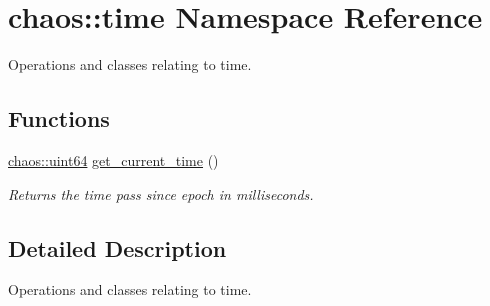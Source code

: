 \hypertarget{namespacechaos_1_1time}{\section{chaos\-:\-:time Namespace Reference}
\label{namespacechaos_1_1time}
}


Operations and classes relating to time.  


\subsection*{Functions}
\begin{DoxyCompactItemize}
\item 
\hypertarget{namespacechaos_1_1time_aaf97a80d1887b42f7a026d102382d27d}{\hyperlink{namespacechaos_a34fe5f5bfc3ef6d80b5d094ed91b4d6e}{chaos\-::uint64} \hyperlink{namespacechaos_1_1time_aaf97a80d1887b42f7a026d102382d27d}{get\-\_\-current\-\_\-time} ()}\label{namespacechaos_1_1time_aaf97a80d1887b42f7a026d102382d27d}

\begin{DoxyCompactList}\small\item\em Returns the time pass since epoch in milliseconds. \end{DoxyCompactList}\end{DoxyCompactItemize}


\subsection{Detailed Description}
Operations and classes relating to time. 